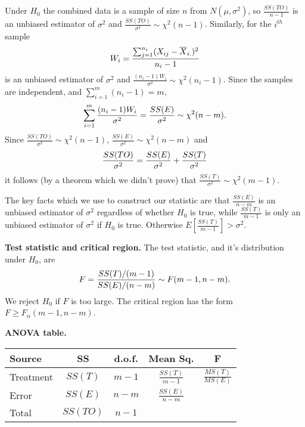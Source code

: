 \documentclass[10pt, two column]{article}
\begin{document}
Under $H_{0}$ the combined data is a sample of size $n$ from $N(\mu, \sigma^{2})$, so $\frac{SS(TO)}{n-1}$ is an unbiased estimator of $\sigma^{2}$ and $\frac{SS(TO)}{\sigma^{2}} \sim \chi^{2}(n-1)$. Similarly, for the $i^{th}$ sample \vspace{-5pt}
\[
W_{i} = \frac{\sum_{j=1}^{n_{i}} (X_{ij} - \overline{X}_{i.})^{2} }{n_{i} - 1} \vspace{-5pt}
\] 
is an unbiased estimator of $\sigma^{2}$ and $\frac{(n_{i} - 1)W_{i}}{\sigma^{2}} \sim \chi^{2}(n_{i}-1)$. Since the samples are independent, and $\sum_{i=1}^{m} (n_{i} - 1) = m$, \vspace{-5pt}
\[
\sum_{i=1}^{m} \frac{(n_{i} - 1)W_{i}}{\sigma^{2}} = \frac{SS(E)}{\sigma^{2}} \sim \chi^{2}(n-m). \vspace{-5pt}
\]
Since $\frac{SS(TO)}{\sigma^{2}} \sim \chi^{2}(n-1)$, $\frac{SS(E)}{\sigma^{2}} \sim \chi^{2}(n-m)$ and \vspace{-5pt}
\[
\frac{SS(TO)}{\sigma^{2}} = \frac{SS(E)}{\sigma^{2}} + \frac{SS(T)}{\sigma^{2}} \vspace{-5pt}
\]
it follows (by a theorem which we didn't prove) that $\frac{SS(T)}{\sigma^{2}} \sim \chi^{2}(m-1)$. 

The key facts which we use to construct our statistic are that $\frac{SS(E)}{n-m}$ is an unbiased estimator of $\sigma^{2}$ regardless of whether $H_{0}$ is true, while $\frac{SS(T)}{m-1}$ is only an unbiased estimator of $\sigma^{2}$ if $H_{0}$ is true. Otherwise $E[\frac{SS(T)}{m-1}] > \sigma^{2}$. 

{\bf Test statistic and critical region.} The test statistic, and it's distribution under $H_{0}$, are \vspace{-5pt}
\[
F = \frac{SS(T)/(m-1)}{SS(E)/(n-m)} \sim F(m-1,n-m). \vspace{-5pt}
\]
We reject $H_{0}$ if $F$ is too large. The critical region has the form $F \geq F_{\alpha}(m-1,n-m)$. 

{\bf ANOVA table.}

{\small
\begin{tabular}{l | c c c c}
Source & SS & d.o.f. & Mean Sq. & F \\
\hline
Treatment & $SS(T)$ & $m-1$ & $\frac{SS(T)}{m-1}$ & $\frac{MS(T)}{MS(E)}$ \\
Error & $SS(E)$ & $n-m$ & $\frac{SS(E)}{n-m}$ \\
Total & $SS(TO)$ & $n-1$\\  
\hline
\end{tabular}}
\end{document}
